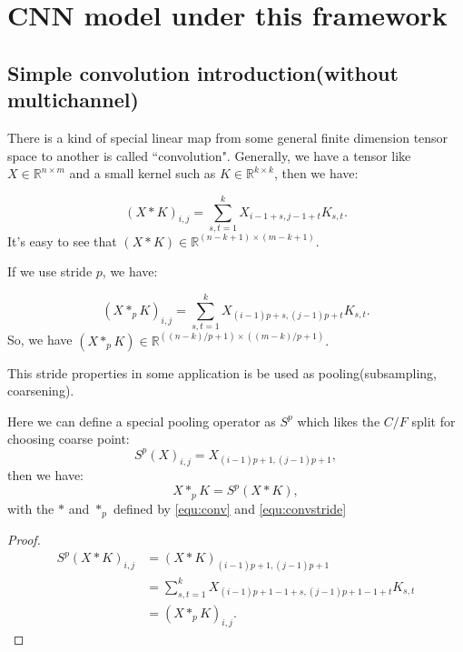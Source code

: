 \section{CNN model under this framework}
\subsection{Simple convolution introduction(without multichannel)}
There is a kind of special linear map from some general finite dimension tensor space to another is called ``convolution".  Generally, we have a tensor like $X \in \mathbb{R}^{n \times m}$ and a small kernel such as $K \in \mathbb{R}^{k\times k}$, then we have:
\begin{definition}
\begin{equation}\label{equ:conv}
(X\ast K)_{i,j} = \sum_{s, t = 1}^k X_{i-1 + s, j-1 + t} K_{s,t}.
\end{equation}
It's easy to see that $(X\ast K) \in \mathbb{R}^{(n-k + 1) \times (m-k + 1)}$.
\end{definition}
If we use stride $p$, we have:
\begin{definition}
\begin{equation}\label{equ:convstride}
(X\ast_{p} K)_{i,j} = \sum_{s, t = 1}^k X_{(i-1)p + s, (j-1)p + t} K_{s,t}.
\end{equation}
So, we have 
$
(X\ast_p K) \in \mathbb{R}^{((n-k)/p + 1) \times ((m-k)/p+1)}.
$
\end{definition}
This stride properties in some application is be used as pooling(subsampling, coarsening).  

Here we can define a special pooling operator as $S^p$ which likes the $C/F$ split for choosing coarse point:
\begin{equation}
S^p(X)_{i,j} = X_{(i-1)p + 1, (j-1)p + 1},
\end{equation}
then we have:
\begin{equation}\label{equ:stride}
X \ast_p K = S^p(X\ast K),
\end{equation}
with the $\ast$ and $\ast_p$ defined by \ref{equ:conv} and \ref{equ:convstride}
\begin{proof}
\begin{align}
S^p(X \ast K)_{i,j} &= (X \ast K)_{(i-1)p+1, (j-1)p + 1}  \\
&= \sum_{s,t = 1}^k X_{(i-1)p + 1 -1 +s, (j-1)p +1 -1 +t}K_{s,t}  \\
&= (X \ast_p K)_{i,j}.
\end{align}
\end{proof}

